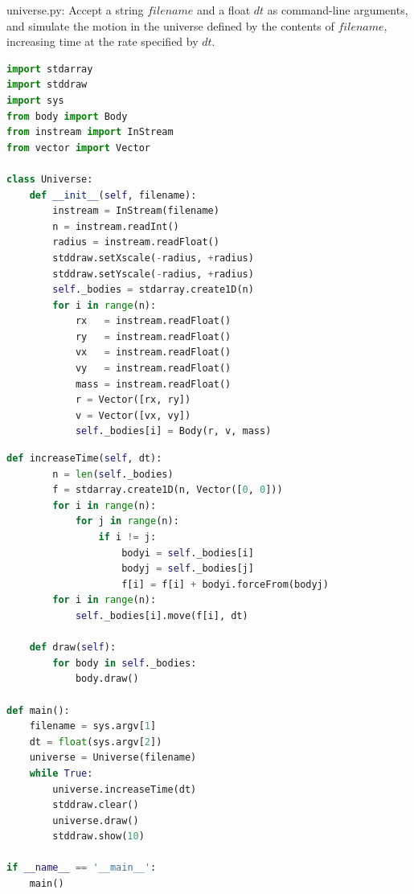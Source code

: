 \documentclass[8pt,a4paper,compress]{beamer}
\begin{document}
\begin{frame}[fragile]
\pause

\begin{framed}
\tiny universe.py: Accept a string $filename$ and a float $dt$ as command-line arguments, and simulate the motion in the universe defined by the contents of $filename$, increasing time at the rate specified by $dt$.
\end{framed}

\begin{lstlisting}[language=Python]
import stdarray
import stddraw
import sys
from body import Body 
from instream import InStream
from vector import Vector

class Universe:
    def __init__(self, filename):
        instream = InStream(filename)
        n = instream.readInt()
        radius = instream.readFloat()
        stddraw.setXscale(-radius, +radius)
        stddraw.setYscale(-radius, +radius)
        self._bodies = stdarray.create1D(n)
        for i in range(n):
            rx   = instream.readFloat()
            ry   = instream.readFloat()
            vx   = instream.readFloat()
            vy   = instream.readFloat()
            mass = instream.readFloat()
            r = Vector([rx, ry])
            v = Vector([vx, vy])
            self._bodies[i] = Body(r, v, mass)
\end{lstlisting}
\end{frame}

\begin{frame}[fragile]
\pause

\begin{lstlisting}[language=Python]
    def increaseTime(self, dt):
        n = len(self._bodies)
        f = stdarray.create1D(n, Vector([0, 0]))
        for i in range(n):
            for j in range(n):
                if i != j:
                    bodyi = self._bodies[i]
                    bodyj = self._bodies[j]
                    f[i] = f[i] + bodyi.forceFrom(bodyj)
        for i in range(n):
            self._bodies[i].move(f[i], dt)    

    def draw(self):
        for body in self._bodies:
            body.draw()

def main():
    filename = sys.argv[1]
    dt = float(sys.argv[2])
    universe = Universe(filename)
    while True:
        universe.increaseTime(dt)
        stddraw.clear()
        universe.draw()
        stddraw.show(10)

if __name__ == '__main__':
    main()
\end{lstlisting}
\end{frame}
\end{document}
